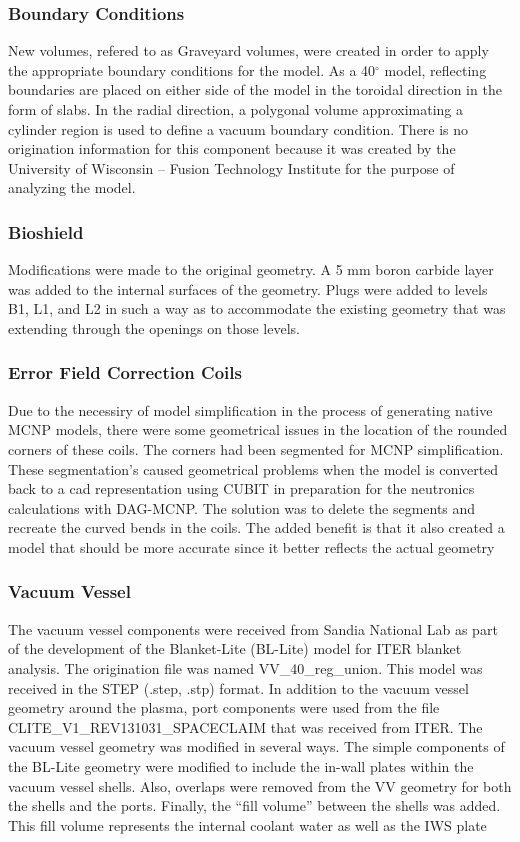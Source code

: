 \documentclass[12pt]{article}
\begin{document}
\subsubsection*{Boundary Conditions}
New volumes, refered to as Graveyard volumes,  were created in order to apply 
the appropriate boundary conditions
for the model.  As a 40${^\circ}$ model, reflecting boundaries are placed on
either side of the model in the toroidal direction in the form of slabs. 
In the radial direction, a polygonal volume approximating a cylinder region is 
used to define a vacuum boundary condition. There is no origination information 
for this component because it was created by the University of Wisconsin – 
Fusion Technology Institute for the purpose of analyzing the model.

\subsubsection*{Bioshield}
Modifications were made to the original geometry. A 5 mm boron carbide layer was
 added to the internal surfaces of the geometry. Plugs were added to levels B1, 
L1, and L2 in such a way as to accommodate the existing geometry that was 
extending through the openings on those levels.

\subsubsection*{Error Field Correction Coils}
Due to the necessiry of model simplification in the process of generating native MCNP 
models, there were some geometrical 
issues in the location of the rounded corners of these coils. The corners had 
been segmented for MCNP simplification. These segmentation's caused geometrical 
problems when the model is converted back to a \gls{cad} representation using CUBIT 
in preparation for the neutronics 
calculations with DAG-MCNP. The solution was to delete the segments and 
recreate the curved bends in the coils. The added benefit is that it also 
created a model that should be more accurate since it better reflects the 
actual geometry

\subsubsection*{Vacuum Vessel}
The vacuum vessel components were received from Sandia National Lab as part of 
the development of the Blanket-Lite (BL-Lite) model for ITER blanket analysis.
The origination file was named VV\_40\_reg\_union. This model was received in the 
STEP (.step, .stp) format. In addition to the vacuum vessel geometry around the
plasma, port components were used from the file CLITE\_V1\_REV131031\_SPACECLAIM 
that was received from ITER. The vacuum vessel geometry was modified in several 
ways. The simple components of the BL-Lite geometry were modified to include 
the in-wall plates within the vacuum vessel shells. Also, overlaps were removed 
from the VV geometry for both the shells and the ports. Finally, the “fill
volume” between the shells was added. This fill volume represents the internal 
coolant water as well as the IWS plate
\end{document}
